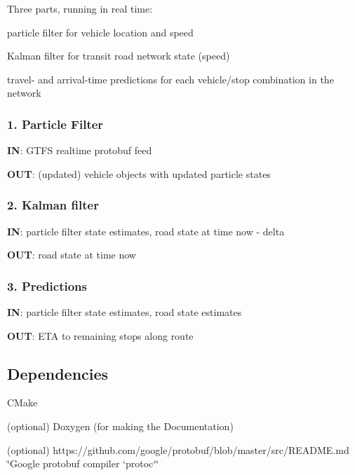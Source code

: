 Three parts, running in real time\+:
\begin{DoxyEnumerate}
\item particle filter for vehicle location and speed
\item Kalman filter for transit road network state (speed)
\item travel-\/ and arrival-\/time predictions for each vehicle/stop combination in the network
\end{DoxyEnumerate}

\subsubsection*{1. Particle Filter}

{\bfseries IN}\+: G\+T\+FS realtime protobuf feed

{\bfseries O\+UT}\+: (updated) vehicle objects with updated particle states

\subsubsection*{2. Kalman filter}

{\bfseries IN}\+: particle filter state estimates, road state at time {\ttfamily now -\/ delta}

{\bfseries O\+UT}\+: road state at time {\ttfamily now}

\subsubsection*{3. Predictions}

{\bfseries IN}\+: particle filter state estimates, road state estimates

{\bfseries O\+UT}\+: E\+TA to remaining stops along route



 \subsection*{Dependencies}


\begin{DoxyItemize}
\item C\+Make
\item (optional) Doxygen (for making the Documentation)
\item (optional) https\+://github.com/google/protobuf/blob/master/src/\+R\+E\+A\+D\+M\+E.\+md \char`\"{}\+Google protobuf compiler `protoc`\char`\"{}
\end{DoxyItemize}

